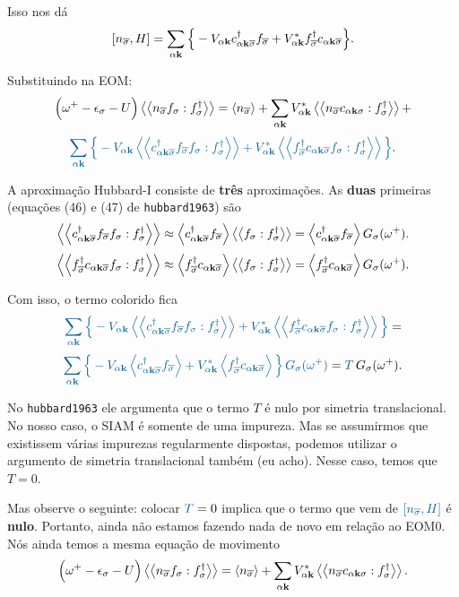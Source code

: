 \documentclass[a4paper,fleqn,12pt]{article}
\begin{document}
Isso nos dá
$$
[n_{\overline{\sigma}}, H] =
\sum_{\alpha \vb{k}} \Big\{
- V_{\alpha \vb{k}} c_{\alpha \vb{k} \overline{\sigma}}^\dagger f_{\overline{\sigma}} +
V_{\alpha \vb{k}}^* f_{\overline{\sigma}}^\dagger c_{\alpha \vb{k} \overline{\sigma}}
\Big\}.
$$

Substituindo na EOM:
$$
\Big(
\omega^+ - \eps_\sigma - U
\Big) \gf{n_{\cc{\sigma}} f_\sigma}{f_\sigma^\dagger} =
\ev{n_{\cc{\sigma}}} +
\sum_{\alpha \k} V_{\alpha \k}^*
\gf{n_{\cc{\sigma}} c_{\alpha \k \sigma}}{f_\sigma^\dagger} +
$$
$$
\textcolor{MidnightBlue}{
\sum_{\alpha \k} \Big\{
- V_{\alpha \k} \gf{c_{\alpha \k \cc{\sigma}}^\dagger f_{\cc{\sigma}} f_\sigma}
{f_\sigma^\dagger}
+ V_{\alpha \k}^* \gf{f_{\cc{\sigma}}^\dagger c_{\alpha \k \cc{\sigma}} f_\sigma}
{f_\sigma^\dagger}
\Big\}}.
$$

A aproximação Hubbard-I consiste de \textbf{três} aproximações. As \textbf{duas} primeiras (equações (46) e (47) de \texttt{hubbard1963}) são
$$
\gf{c_{\alpha \k \cc{\sigma}}^\dagger f_{\cc{\sigma}} f_\sigma}{f_\sigma^\dagger}
\approx
\ev{c_{\alpha \k \cc{\sigma}}^\dagger f_{\cc{\sigma}}} \gf{f_\sigma}{f_\sigma^\dagger}
=
\ev{c_{\alpha \k \cc{\sigma}}^\dagger f_{\cc{\sigma}}} G_\sigma(\omega^+).
$$
$$
\gf{f_{\cc{\sigma}}^\dagger c_{\alpha \k \cc{\sigma}} f_\sigma}{f_\sigma^\dagger}
\approx
\ev{f_{\cc{\sigma}}^\dagger c_{\alpha \k \cc{\sigma}}} \gf{f_\sigma}{f_\sigma^\dagger}
=
\ev{f_{\cc{\sigma}}^\dagger c_{\alpha \k \cc{\sigma}}} G_\sigma(\omega^+).
$$

Com isso, o termo colorido fica
$$
\textcolor{MidnightBlue}{
\sum_{\alpha \k} \Big\{
- V_{\alpha \k} \gf{c_{\alpha \k \cc{\sigma}}^\dagger f_{\cc{\sigma}} f_\sigma}
{f_\sigma^\dagger}
+ V_{\alpha \k}^* \gf{f_{\cc{\sigma}}^\dagger c_{\alpha \k \cc{\sigma}} f_\sigma}
{f_\sigma^\dagger}
\Big\}} =
$$
$$
\textcolor{MidnightBlue}{
\sum_{\alpha \k} \Big\{
- V_{\alpha \k} \ev{c_{\alpha \k \cc{\sigma}}^\dagger f_{\cc{\sigma}}}
+ V_{\alpha \k}^* \ev{f_{\cc{\sigma}}^\dagger c_{\alpha \k \cc{\sigma}}}
\Big\}  \, G_\sigma(\omega^+) } = \textcolor{MidnightBlue}{T} \, G_\sigma(\omega^+).
$$

No \texttt{hubbard1963} ele argumenta que o termo $T$ é nulo por simetria translacional. No nosso caso, o SIAM é somente de uma impureza. Mas se assumirmos que existissem várias impurezas regularmente dispostas, podemos utilizar o argumento de simetria translacional também (eu acho). Nesse caso, temos que $T = 0$.

Mas observe o seguinte: colocar $\textcolor{MidnightBlue}{T} = 0$ implica que o termo que vem de $\textcolor{MidnightBlue}{[n_{\cc{\sigma}}, H]}$ é \textbf{nulo}. Portanto, ainda não estamos fazendo nada de novo em relação ao EOM0. Nós ainda temos a mesma equação de movimento
$$
\Big(
\omega^+ - \eps_\sigma - U
\Big) \gf{n_{\cc{\sigma}} f_\sigma}{f_\sigma^\dagger} =
\ev{n_{\cc{\sigma}}} +
\sum_{\alpha \k} V_{\alpha \k}^*
\gf{n_{\cc{\sigma}} c_{\alpha \k \sigma}}{f_\sigma^\dagger}.
$$
\end{document}
